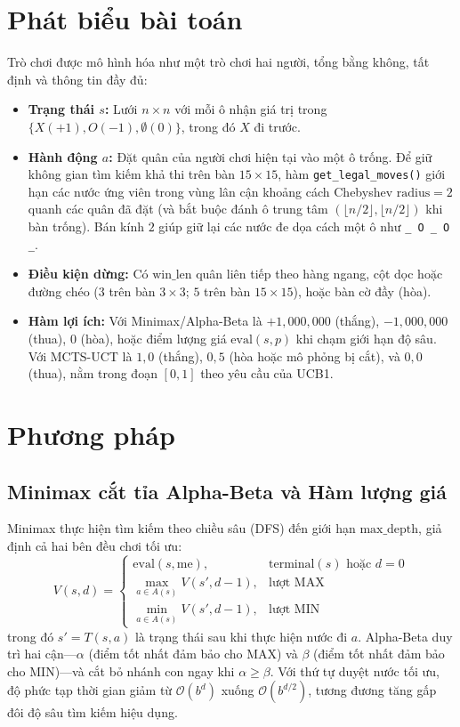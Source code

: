 \documentclass[conference]{IEEEtran}
\begin{document}
\section{Phát biểu bài toán}
Trò chơi được mô hình hóa như một trò chơi hai người, tổng bằng không, tất định và thông tin đầy đủ:
\begin{itemize}
    \item \textbf{Trạng thái $s$:} Lưới $n \times n$ với mỗi ô nhận giá trị trong $\{X (+1), O (-1), \emptyset (0)\}$, trong đó $X$ đi trước.
    \item \textbf{Hành động $a$:} Đặt quân của người chơi hiện tại vào một ô trống. Để giữ không gian tìm kiếm khả thi trên bàn $15\times 15$, hàm \texttt{get\_legal\_moves()} giới hạn các nước ứng viên trong vùng lân cận khoảng cách Chebyshev $\text{radius} = 2$ quanh các quân đã đặt (và bắt buộc đánh ô trung tâm $(\lfloor n/2 \rfloor, \lfloor n/2 \rfloor)$ khi bàn trống). Bán kính $2$ giúp giữ lại các nước đe dọa cách một ô như \texttt{\_ O \_ O \_}.
    \item \textbf{Điều kiện dừng:} Có $\text{win\_len}$ quân liên tiếp theo hàng ngang, cột dọc hoặc đường chéo ($3$ trên bàn $3\times 3$; $5$ trên bàn $15\times 15$), hoặc bàn cờ đầy (hòa).
    \item \textbf{Hàm lợi ích:} Với Minimax/Alpha-Beta là $+1{,}000{,}000$ (thắng), $-1{,}000{,}000$ (thua), $0$ (hòa), hoặc điểm lượng giá $\text{eval}(s, p)$ khi chạm giới hạn độ sâu. Với MCTS-UCT là $1{,}0$ (thắng), $0{,}5$ (hòa hoặc mô phỏng bị cắt), và $0{,}0$ (thua), nằm trong đoạn $[0, 1]$ theo yêu cầu của UCB1.
\end{itemize}

\section{Phương pháp}

\subsection{Minimax cắt tỉa Alpha-Beta và Hàm lượng giá}
Minimax thực hiện tìm kiếm theo chiều sâu (DFS) đến giới hạn $\text{max\_depth}$, giả định cả hai bên đều chơi tối ưu:
\begin{equation}
V(s, d) =
\begin{cases}
\text{eval}(s, \text{me}), & \text{terminal}(s) \text{ hoặc } d = 0 \\
\max_{a \in A(s)} V(s', d - 1), & \text{lượt MAX} \\
\min_{a \in A(s)} V(s', d - 1), & \text{lượt MIN}
\end{cases}
\end{equation}
trong đó $s' = T(s, a)$ là trạng thái sau khi thực hiện nước đi $a$. Alpha-Beta duy trì hai cận---$\alpha$ (điểm tốt nhất đảm bảo cho MAX) và $\beta$ (điểm tốt nhất đảm bảo cho MIN)---và cắt bỏ nhánh con ngay khi $\alpha \ge \beta$. Với thứ tự duyệt nước tối ưu, độ phức tạp thời gian giảm từ $\mathcal{O}(b^d)$ xuống $\mathcal{O}(b^{d/2})$, tương đương tăng gấp đôi độ sâu tìm kiếm hiệu dụng.
\end{document}
